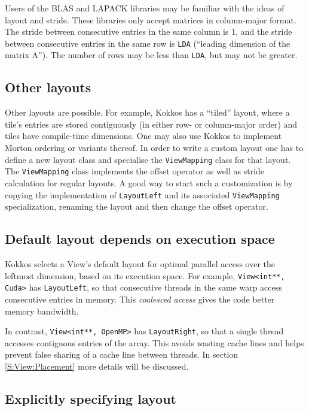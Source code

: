 Users of the BLAS and LAPACK libraries may be familiar with the ideas
of layout and stride.  These libraries only accept matrices in
column-major format.  The stride between consecutive entries in the
same column is 1, and the stride between consecutive entries in the
same row is \lstinline!LDA! (``leading dimension of the matrix A'').  The
number of rows may be less than \lstinline!LDA!, but may not be greater.

\subsection{Other layouts}\label{SS:View::Layout::Other}

Other layouts are possible.  For example, Kokkos has a ``tiled''
layout, where a tile's entries are stored contiguously (in either row-
or column-major order) and tiles have compile-time dimensions.  One
may also use Kokkos to implement Morton ordering or variants thereof.
In order to write a custom layout one has to define a new layout class and
specialise the \lstinline|ViewMapping| class for that layout. 
The \lstinline|ViewMapping| class implements the offset operator as well
as stride calculation for regular layouts. 
A good way to start such a customization is by copying the implementation of 
\lstinline|LayoutLeft| and its associated \lstinline|ViewMapping| specialization,
renaming the layout and then change the offset operator. 

\subsection{Default layout depends on execution space}\label{SS:View:Layout:Default}

Kokkos selects a View's default layout for optimal parallel access
over the leftmost dimension, based on its execution space.  For
example, \lstinline!View<int**, Cuda>! has \lstinline!LayoutLeft!, so that
consecutive threads in the same warp access consecutive entries in
memory.  This \emph{coalesced access} gives the code better memory
bandwidth.  

In contrast, \lstinline!View<int**, OpenMP>! has
\lstinline!LayoutRight!, so that a single thread accesses contiguous
entries of the array.  This avoids wasting cache lines and helps
prevent false sharing of a cache line between threads. 
In section \ref{S:View:Placement} more details will be discussed. 

\subsection{Explicitly specifying layout}\label{SS:View:Layout:Explicit}

